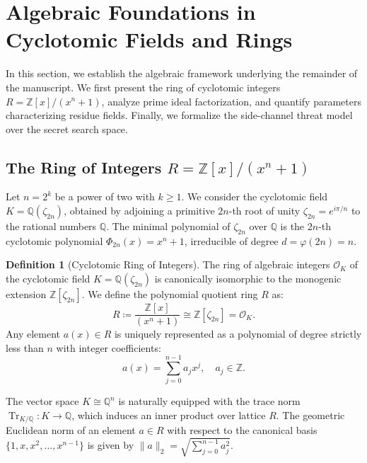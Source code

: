 \documentclass[11pt,a4paper]{article}
\theoremstyle{plain}
\theoremstyle{definition}
\newtheorem{definicion}[teorema]{Definition}
\numberwithin{equation}{section}
\newcommand{\QQ}{\mathbb{Q}}
\newcommand{\ZZ}{\mathbb{Z}}
\newcommand{\cO}{\mathcal{O}}
\newcommand{\Tr}{\operatorname{Tr}}
\begin{document}
\section{Algebraic Foundations in Cyclotomic Fields and Rings}
\label{sec:preliminares}

In this section, we establish the algebraic framework underlying the remainder of the manuscript. We first present the ring of cyclotomic integers $R = \ZZ[x]/(x^n+1)$, analyze prime ideal factorization, and quantify parameters characterizing residue fields. Finally, we formalize the side-channel threat model over the secret search space.

\subsection{The Ring of Integers \texorpdfstring{$R = \ZZ[x]/(x^n+1)$}{R = Z[x]/(x^n+1)}}

Let $n = 2^k$ be a power of two with $k \ge 1$. We consider the cyclotomic field $K = \QQ(\zeta_{2n})$, obtained by adjoining a primitive $2n$-th root of unity $\zeta_{2n} = e^{i\pi/n}$ to the rational numbers $\QQ$. The minimal polynomial of $\zeta_{2n}$ over $\QQ$ is the $2n$-th cyclotomic polynomial $\Phi_{2n}(x) = x^n + 1$, irreducible of degree $d = \varphi(2n) = n$.

\begin{definicion}[Cyclotomic Ring of Integers]
The ring of algebraic integers $\cO_K$ of the cyclotomic field $K = \QQ(\zeta_{2n})$ is canonically isomorphic to the monogenic extension $\ZZ[\zeta_{2n}]$. We define the polynomial quotient ring $R$ as:
\begin{equation}
R \coloneqq \frac{\ZZ[x]}{(x^n+1)} \cong \ZZ[\zeta_{2n}] = \cO_K.
\end{equation}
Any element $a(x) \in R$ is uniquely represented as a polynomial of degree strictly less than $n$ with integer coefficients:
\begin{equation}
a(x) = \sum_{j=0}^{n-1} a_j x^j, \quad a_j \in \ZZ.
\end{equation}
\end{definicion}

The vector space $K \cong \QQ^n$ is naturally equipped with the trace norm $\Tr_{K/\QQ}: K \to \QQ$, which induces an inner product over lattice $R$. The geometric Euclidean norm of an element $a \in R$ with respect to the canonical basis $\{1, x, x^2, \dots, x^{n-1}\}$ is given by $\|a\|_2 = \sqrt{\sum_{j=0}^{n-1} a_j^2}$.
\end{document}
